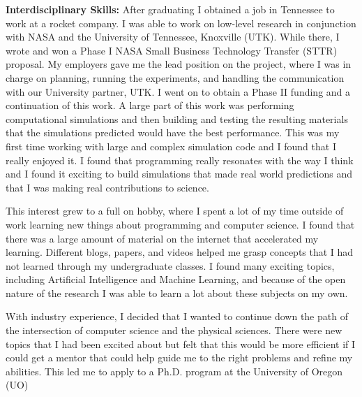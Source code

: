 \documentclass[12pt]{article}
\begin{document}
\textbf{Interdisciplinary Skills: }After graduating I obtained a job in
Tennessee to work at a rocket company.  I was able to work on low-level research
in conjunction with NASA and the University of Tennessee, Knoxville (UTK). While
there, I wrote and won a Phase I NASA Small Business Technology Transfer (STTR)
proposal. My employers gave me the lead position on the project, where I was in
charge on planning, running the experiments, and handling the communication with
our University partner, UTK. I went on to obtain a Phase II funding and a
continuation of this work. A large part of this work was performing
computational simulations and then building and testing the resulting materials
that the simulations predicted would have the best performance. This was my
first time working with large and complex simulation code and I found that I
really enjoyed it. I found that programming really resonates with the way I
think and I found it exciting to build simulations that made real world
predictions and that I was making real contributions to science. 

This interest grew to a full on hobby, where I spent a lot of my time outside of
work learning new things about programming and computer science. I found that
there was a large amount of material on the internet that accelerated my
learning. Different blogs, papers, and videos helped me grasp concepts that I
had not learned through my undergraduate classes. I found many exciting topics,
including Artificial Intelligence and Machine Learning, and because of the open
nature of the research I was able to learn a lot about these subjects on my own.

With industry experience, I decided that I wanted to continue down the path
of the intersection of computer science and the physical sciences. There were
new topics that I had been excited about but felt that this
would be more efficient if I could get a mentor that could help guide me to the
right problems and refine my abilities. This led me to apply to a Ph.D. program
at the University of Oregon (UO)
\end{document}
